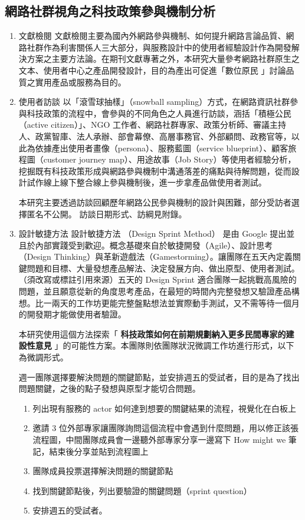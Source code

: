 \documentclass[12pt,a4paper]{article}
\begin{document}
\subsection{網路社群視角之科技政策參與機制分析}
\label{sec:org09c0d5e}
\begin{enumerate}
\item 文獻檢閱
\label{sec:org8999f3f}
文獻檢閱主要為國內外網路參與機制、如何提升網路言論品質、網路社群作為利害關係人三大部分，與服務設計中的使用者經驗設計作為開發解決方案之主要方法論。在期刊文獻專著之外，本研究大量參考網路社群原生之文本、使用者中心之產品開發設計，目的為產出可促進「數位原民 」討論品質之實用產品或服務為目的。
\item 使用者訪談
\label{sec:org1cb6959}
以「滾雪球抽樣」（snowball sampling）方式，在網路資訊社群參與科技政策的流程中，會參與的不同角色之人員進行訪談，涵括「積極公民（active citizen）」、NGO 工作者、網路社群專家、政策分析師、審議主持人、政黨智庫、法人承辦、部會幕僚、高層事務官、外部顧問、政務官等，以此為依據產出使用者畫像（persona）、服務藍圖（service blueprint）、顧客旅程圖（customer journey map）、用途故事（Job Story）等使用者經驗分析，挖掘既有科技政策形成與網路參與機制中溝通落差的痛點與待解問題，從而設計試作線上線下整合線上參與機制後，進一步拿產品做使用者測試。

本研究主要透過訪談回顧歷年網路公民參與機制的設計與困難，部分受訪者選擇匿名不公開。 訪談日期形式、訪綱見附錄。
\item 設計敏捷方法
\label{sec:orge00802a}
設計敏捷方法 （Design Sprint Method）\cite{jake16} 是由 Google 提出並且於內部實踐受到歡迎。概念基礎來自於敏捷開發（Agile）、設計思考（Design Thinking）與革新遊戲法（Gamestorming）。讓團隊在五天內定義關鍵問題和目標、大量發想產品解法、決定發展方向、做出原型、使用者測試。（須改寫或標註引用來源）五天的 Design Sprint 適合團隊一起挑戰高風險的問題，並且願意從新的角度思考產品，在最短的時間內完整發想又驗證產品構想。比一兩天的工作坊更能完整盤點想法並實際動手測試，又不需等待一個月的開發期才能做使用者驗證。

本研究使用這個方法探索「 \textbf{科技政策如何在前期規劃納入更多民間專家的建設性意見} 」的可能性方案。本團隊則依團隊狀況微調工作坊進行形式，以下為微調形式。

週一團隊選擇要解決問題的關鍵節點，並安排週五的受試者，目的是為了找出問題關鍵，之後的點子發想與原型才能切合問題。
\begin{enumerate}
\item 列出現有服務的 actor 如何達到想要的關鍵結果的流程，視覺化在白板上
\item 邀請 3 位外部專家讓團隊詢問這個流程中會遇到什麼問題，用以修正該張流程圖，中間團隊成員會一邊聽外部專家分享一邊寫下 How might we 筆記，結束後分享並貼到流程圖上
\item 團隊成員投票選擇解決問題的關鍵節點
\item 找到關鍵節點後，列出要驗證的關鍵問題（sprint question）
\item 安排週五的受試者。
\end{enumerate}


\end{enumerate}
\end{document}
